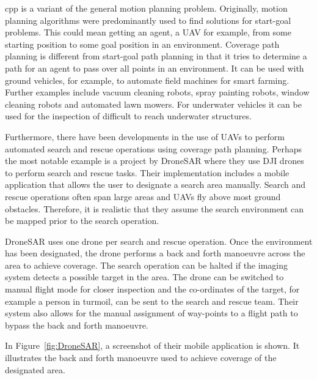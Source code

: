 \Acf{cpp} is a variant of the general motion planning problem. Originally, motion planning algorithms were predominantly used to find solutions for start-goal problems\cite{Choset2001}. This could mean getting an agent, a UAV for example, from some starting position to some goal position in an environment\cite{Lynch2017}. Coverage path planning is different from start-goal path planning in that it tries to determine a path for an agent to pass over all points in an environment\cite{Choset2001}. It can be used with ground vehicles, for example, to automate field machines for smart farming\cite{Hameed2014}. Further examples include vacuum cleaning robots, spray painting robots\cite{Atkar2005}, window cleaning robots\cite{Mir-Nasiri2018} and automated lawn mowers\cite{Arkin1999}. For underwater vehicles it can be used for the inspection of difficult to reach underwater structures\cite{Englot2012}. 

Furthermore, there have been developments in the use of UAVs to perform automated search and rescue operations using coverage path planning. Perhaps the most notable example is a project by DroneSAR where they use DJI drones to perform search and rescue tasks. Their implementation includes a mobile application that allows the user to designate a search area manually\cite{DroneSAR01}. Search and rescue operations often span large areas and UAVs fly above most ground obstacles. Therefore, it is realistic that they assume the search environment can be mapped prior to the search operation\cite{CPP-Survey-2013}.

DroneSAR uses one drone per search and rescue operation. Once the environment has been designated, the drone performs a back and forth manoeuvre across the area to achieve coverage. The search operation can be halted if the imaging system detects a possible target in the area. The drone can be switched to manual flight mode for closer inspection and the co-ordinates of the target, for example a person in turmoil, can be sent to the search and rescue team. Their system also allows for the manual assignment of way-points to a flight path to bypass the back and forth manoeuvre.\cite{DroneSAR02}

In Figure~\ref{fig:DroneSAR}, a screenshot of their mobile application is shown. It illustrates the back and forth manoeuvre used to achieve coverage of the designated area.

